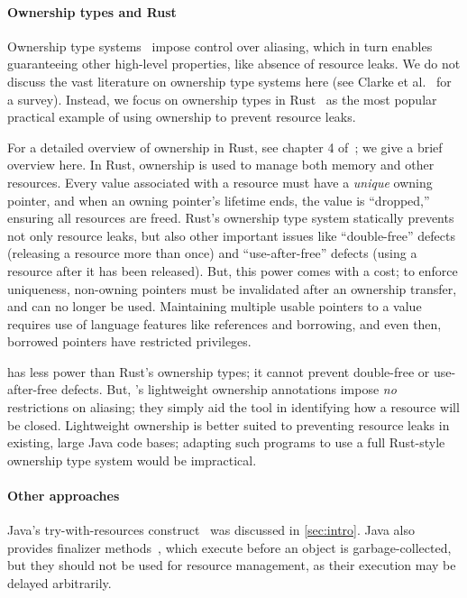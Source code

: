\paragraph{Ownership types and Rust} Ownership type
systems~\cite{clarke2013ownership} impose control over aliasing, which
in turn enables guaranteeing other high-level properties, like absence of
resource leaks.  We do not discuss the vast literature on ownership type systems
here (see Clarke et al.~\cite{clarke2013ownership} for a survey). Instead, we
focus on ownership types in Rust~\cite{klabnik2018rust} as the most popular
practical example of using ownership to prevent resource leaks.

For a detailed overview of ownership in Rust, see chapter 4
of~\cite{klabnik2018rust}; we give a brief overview here.  In Rust, ownership is
used to manage both memory and other resources.  Every value associated with a
resource must have a \emph{unique} owning pointer, and when an owning pointer's
lifetime ends, the value is ``dropped,'' ensuring all resources are freed.
Rust's ownership type system statically prevents
not only resource leaks, but also other important issues like ``double-free'' defects
(releasing a resource more than once) and ``use-after-free'' defects (using a
resource after it has been released). But, this power comes with a cost; to
enforce uniqueness, non-owning pointers must be invalidated after an ownership transfer,
and can no longer be used.  Maintaining multiple
usable pointers to a value requires use of language features like references and
borrowing, and even then, borrowed pointers have restricted privileges.

\Tool has less power than Rust's ownership types; it cannot prevent double-free
or use-after-free defects.  But,
\tool's lightweight ownership annotations impose \emph{no} restrictions on
aliasing; they simply aid the tool in identifying how a resource will
be closed.  Lightweight ownership is better suited to preventing
resource leaks in existing, large Java code bases; adapting such programs to use
a full Rust-style ownership type system would be impractical.

\paragraph{Other approaches} Java's try-with-resources
construct~\cite{try-with-resources} was discussed in \cref{sec:intro}.  Java
also provides finalizer methods~\cite[Chapter 12]{gosling2014jls}, which execute before an object is
garbage-collected, but they should not be used for resource management, as their
execution may be delayed arbitrarily.

